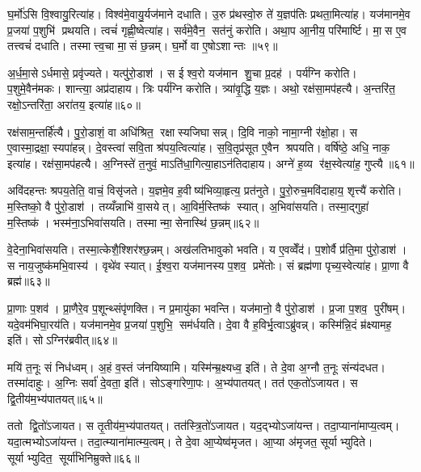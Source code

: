 घ॒र्मो॑ऽसि वि॒श्वायु॒रित्या॑ह। विश्व॑मे॒वायु॒र्यज॑माने दधाति। उ॒रु प्र॑थस्वो॒रु ते॑ य॒ज्ञप॑तिः प्रथता॒मित्या॑ह। यज॑मानमे॒व प्र॒जया॑ प॒शुभि॑ प्रथयति। त्वचं॑ गृह्णी॒ष्वेत्या॑ह। सर्व॑मे॒वैन॒ सत॑नुं करोति। अथा॒प आ॒नीय॒ परि॑मार्ष्टि। मा॒स ए॒व तत्त्वचं॑ दधाति। तस्मात्त्व॒चा मा॒सं छ॒न्नम्। घ॒र्मो वा ए॒षोऽशान्तः ॥५९॥

अ॒र्ध॒मा॒सेऽर्धमासे॒ प्रवृ॑ज्यते। यत्पु॑रो॒डाश॑। स ईश्व॒रो यज॑मान शु॒चा प्र॒दह॑। पर्य॑ग्नि करोति। प॒शुमे॒वैन॑मकः। शान्त्या॒ अप्र॑दाहाय। त्रिः पर्य॑ग्नि करोति। त्र्या॑वृ॒द्धि य॒ज्ञः। अथो॒ रक्ष॑सा॒मप॑हत्यै। अ॒न्तरि॑त॒ रक्षो॒ऽन्तरि॑ता॒ अरा॑तय॒ इत्या॑ह॥६०॥

रक्ष॑साम॒न्तर्\mbox{}हि॑त्यै। पु॒रो॒डाशं॒ वा अधि॑श्रित॒ रक्षास्यजिघासन्न्। दि॒वि नाको॒ नामा॒ग्नी र॑क्षो॒हा। स ए॒वास्मा॒द्रक्षा॒स्यपा॑हन्न्। दे॒वस्त्वा॑ सवि॒ता श्र॑पय॒त्वित्या॑ह। स॒वि॒तृप्र॑सूत ए॒वैन श्रपयति। वर्\mbox{}षि॑ष्ठे॒ अधि॒ नाक॒ इत्या॑ह। रक्ष॑सा॒मप॑हत्यै। अ॒ग्निस्ते॑ त॒नुवं॒ माऽति॑धा॒गित्या॒हाऽन॑तिदाहाय। अग्ने॑ ह॒व्य र॑क्ष॒स्वेत्या॑ह॒ गुप्त्यै॥६१॥

अवि॑दहन्तः श्रपय॒तेति॒ वाचं॒ विसृ॑जते। य॒ज्ञमे॒व ह॒वीष्य॑भिव्या॒हृत्य॒ प्रत॑नुते। पु॒रो॒रुच॒मवि॑दाहाय॒ शृत्त्यै॑ करोति। म॒स्तिष्को॒ वै पु॑रो॒डाश॑। तय्यँन्नाभि॑ वा॒सयेत्। आ॒विर्म॒स्तिष्क॑ स्यात्। अ॒भिवा॑सयति। तस्मा॒द्गुहा॑ म॒स्तिष्क॑। भस्म॑ना॒ऽभिवा॑सयति। तस्मान्मा॒सेनास्थि॑ छ॒न्नम्॥६२॥

वे॒देना॒भिवा॑सयति। तस्मा॒त्केशै॒श्शिर॑श्छ॒न्नम्। अख॑लतिभावुको भवति। य ए॒वव्वेँद॑। प॒शोर्वै प्र॑ति॒मा पु॑रो॒डाश॑। स नाय॒जुष्क॑मभि॒वास्य॑। वृथे॑व स्यात्। ई॒श्व॒रा यज॑मानस्य प॒शव॒ प्रमे॑तोः। सं ब्रह्म॑णा पृच्य॒स्वेत्या॑ह। प्रा॒णा वै ब्रह्म॑॥६३॥

प्रा॒णाः प॒शव॑। प्रा॒णैरे॒व प॒शून्थ्संपृ॑णक्ति। न प्र॒मायु॑का भवन्ति। यज॑मानो॒ वै पु॑रो॒डाश॑। प्र॒जा प॒शव॒ पुरी॑षम्। यदे॒वम॑भिघा॒रय॑ति। यज॑मानमे॒व प्र॒जया॑ प॒शुभि॒ सम॑र्धयति। दे॒वा वै ह॒विर्भृ॒त्वाऽब्रु॑वन्न्। कस्मि॑न्नि॒दं म्र॑क्ष्यामह॒ इति॑। सोऽग्निर॑ब्रवीत्॥६४॥

मयि॑ त॒नूः सं निध॑ध्वम्। अ॒हं व॒स्तं ज॑नयिष्यामि। यस्मि॑न्म्र॒क्ष्यध्व॒ इति॑। ते दे॒वा अ॒ग्नौ त॒नूः संन्य॑दधत। तस्मा॑दाहुः। अ॒ग्निः सर्वा॑ दे॒वता॒ इति॑। सोऽङ्गा॑रेणा॒पः। अ॒भ्य॑पातयत्। तत॑ एक॒तो॑ऽजायत। स द्वि॒तीय॑म॒भ्य॑पातयत्॥६५॥

ततो द्वि॒तो॑ऽजायत। स तृ॒तीय॑म॒भ्य॑पातयत्। तत॑स्त्रि॒तो॑ऽजायत। यद॒द्भ्योऽजा॑यन्त। तदा॒प्याना॑माप्य॒त्वम्। यदा॒त्मभ्योऽजा॑यन्त। तदा॒त्म्याना॑मात्म्य॒त्वम्। ते दे॒वा आ॒प्येष्व॑मृजत। आ॒प्या अ॑मृजत॒ सूर्याभ्युदिते। सूर्याभ्युदित॒ सूर्या॑भिनिम्रुक्ते॥६६॥

